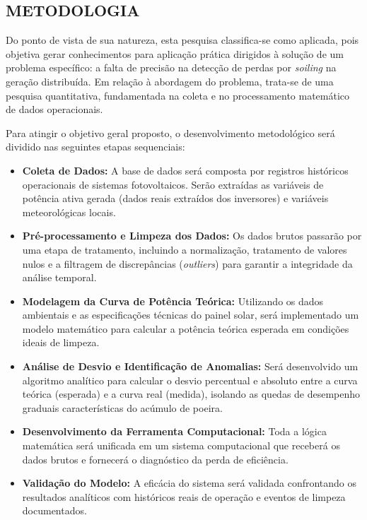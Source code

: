 \documentclass{UNESC}
\begin{document}
\subsection{METODOLOGIA}

Do ponto de vista de sua natureza, esta pesquisa classifica-se como aplicada, pois objetiva gerar conhecimentos para aplicação prática dirigidos à solução de um problema específico: a falta de precisão na detecção de perdas por \textit{soiling} na geração distribuída. Em relação à abordagem do problema, trata-se de uma pesquisa quantitativa, fundamentada na coleta e no processamento matemático de dados operacionais.

Para atingir o objetivo geral proposto, o desenvolvimento metodológico será dividido nas seguintes etapas sequenciais:

\begin{itemize}
    \item \textbf{Coleta de Dados:} A base de dados será composta por registros históricos operacionais de sistemas fotovoltaicos. Serão extraídas as variáveis de potência ativa gerada (dados reais extraídos dos inversores) e variáveis meteorológicas locais.
    \item \textbf{Pré-processamento e Limpeza dos Dados:} Os dados brutos passarão por uma etapa de tratamento, incluindo a normalização, tratamento de valores nulos e a filtragem de discrepâncias (\textit{outliers}) para garantir a integridade da análise temporal.
    \item \textbf{Modelagem da Curva de Potência Teórica:} Utilizando os dados ambientais e as especificações técnicas do painel solar, será implementado um modelo matemático para calcular a potência teórica esperada em condições ideais de limpeza.
    \item \textbf{Análise de Desvio e Identificação de Anomalias:} Será desenvolvido um algoritmo analítico para calcular o desvio percentual e absoluto entre a curva teórica (esperada) e a curva real (medida), isolando as quedas de desempenho graduais características do acúmulo de poeira.
    \item \textbf{Desenvolvimento da Ferramenta Computacional:} Toda a lógica matemática será unificada em um sistema computacional que receberá os dados brutos e fornecerá o diagnóstico da perda de eficiência.
    \item \textbf{Validação do Modelo:} A eficácia do sistema será validada confrontando os resultados analíticos com históricos reais de operação e eventos de limpeza documentados.
\end{itemize}
\end{document}
